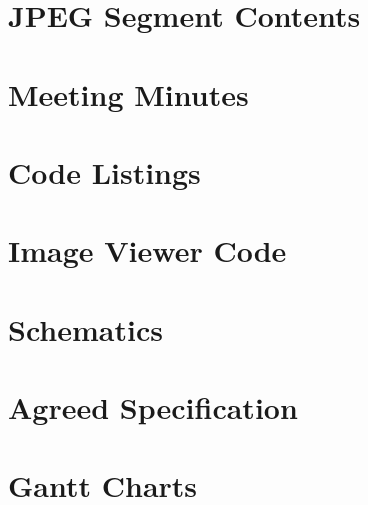 \documentclass[oneside]{ecsgdp}         %
\begin{document}



\newpage

\appendix
\chapter{JPEG Segment Contents}
\label{chap:jpeg-segment-contents}

\chapter{Meeting Minutes}
\label{chap:meeting_minutes}

\newpage
\chapter{Code Listings}
\label{chap:Matlab_code}

\newpage
\chapter{Image Viewer Code}

\newpage

\newpage

\newpage
\chapter{Schematics}


\newpage

\chapter{Agreed Specification}

\newpage

\chapter{Gantt Charts}

\newpage

\backmatter



\end{document}
